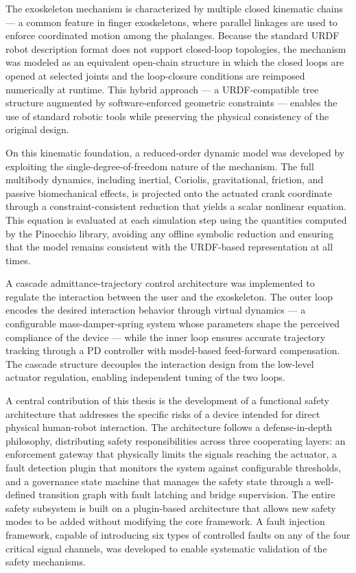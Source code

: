 The exoskeleton mechanism is characterized by multiple closed kinematic chains — a common feature in finger exoskeletons, where parallel linkages are used to enforce coordinated motion among the phalanges. Because the standard URDF robot description format does not support closed-loop topologies, the mechanism was modeled as an equivalent open-chain structure in which the closed loops are opened at selected joints and the loop-closure conditions are reimposed numerically at runtime. This hybrid approach — a URDF-compatible tree structure augmented by software-enforced geometric constraints — enables the use of standard robotic tools while preserving the physical consistency of the original design.
 
On this kinematic foundation, a reduced-order dynamic model was developed by exploiting the single-degree-of-freedom nature of the mechanism. The full multibody dynamics, including inertial, Coriolis, gravitational, friction, and passive biomechanical effects, is projected onto the actuated crank coordinate through a constraint-consistent reduction that yields a scalar nonlinear equation. This equation is evaluated at each simulation step using the quantities computed by the Pinocchio library, avoiding any offline symbolic reduction and ensuring that the model remains consistent with the URDF-based representation at all times.
 
A cascade admittance-trajectory control architecture was implemented to regulate the interaction between the user and the exoskeleton. The outer loop encodes the desired interaction behavior through virtual dynamics — a configurable mass-damper-spring system whose parameters shape the perceived compliance of the device — while the inner loop ensures accurate trajectory tracking through a PD controller with model-based feed-forward compensation. The cascade structure decouples the interaction design from the low-level actuator regulation, enabling independent tuning of the two loops.
 
A central contribution of this thesis is the development of a functional safety architecture that addresses the specific risks of a device intended for direct physical human-robot interaction. The architecture follows a defense-in-depth philosophy, distributing safety responsibilities across three cooperating layers: an enforcement gateway that physically limits the signals reaching the actuator, a fault detection plugin that monitors the system against configurable thresholds, and a governance state machine that manages the safety state through a well-defined transition graph with fault latching and bridge supervision. The entire safety subsystem is built on a plugin-based architecture that allows new safety modes to be added without modifying the core framework. A fault injection framework, capable of introducing six types of controlled faults on any of the four critical signal channels, was developed to enable systematic validation of the safety mechanisms.
 
